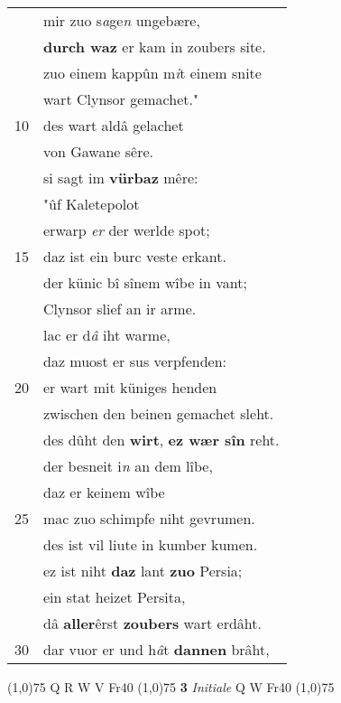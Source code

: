 \documentclass[8pt,a4paper,notitlepage]{article}
\begin{document}
\begin{table}[ht]
\begin{minipage}[t]{0.5\linewidth}
\begin{tabular}{rl}
 & mir zuo s\textit{a}ge\textit{n} ungebære,\\ 
 & \textbf{durch waz} er kam in zoubers site.\\ 
 & zuo einem kappûn m\textit{i}t einem snite\\ 
 & wart Clynsor gemachet."\\ 
10 & des wart aldâ gelachet\\ 
 & von Gawane sêre.\\ 
 & si sagt im \textbf{vürbaz} mêre:\\ 
 & "ûf Kaletepolot\\ 
 & erwarp \textit{er} der werlde spot;\\ 
15 & daz ist ein burc veste erkant.\\ 
 & der künic bî sînem wîbe in vant;\\ 
 & Clynsor slief an ir arme.\\ 
 & lac er d\textit{â} iht warme,\\ 
 & daz muost er sus verpfenden:\\ 
20 & er wart mit küniges henden\\ 
 & zwischen den beinen gemachet sleht.\\ 
 & des dûht den \textbf{wirt}, \textbf{ez wær sîn} reht.\\ 
 & der besneit i\textit{n} an dem lîbe,\\ 
 & daz er keinem wîbe\\ 
25 & mac zuo schimpfe niht gevrumen.\\ 
 & des ist vil liute in kumber kumen.\\ 
 & ez ist niht \textbf{daz} lant \textbf{zuo} Persia;\\ 
 & ein stat heizet Persita,\\ 
 & dâ \textbf{aller}êrst \textbf{zoubers} wart erdâht.\\ 
30 & dar vuor er und h\textit{â}t \textbf{dannen} brâht,\\ 
\end{tabular}
\scriptsize
\line(1,0){75} \newline
Q R W V Fr40 \newline
\line(1,0){75} \newline
\textbf{3} \textit{Initiale} Q W Fr40  \newline
\line(1,0){75} \newline

\end{minipage}
\end{table}
\end{document}
